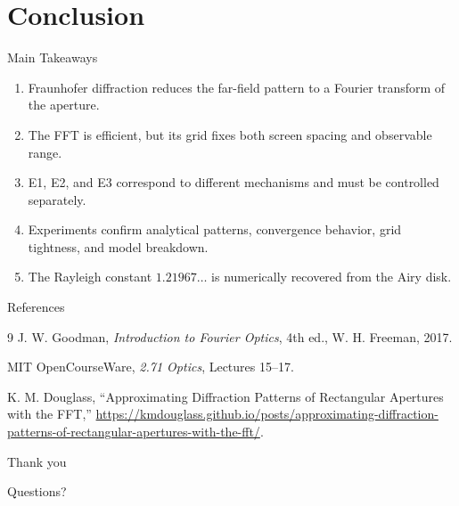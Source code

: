 \documentclass[aspectratio=169,11pt]{beamer}
\begin{document}
\section{Conclusion}

\begin{frame}{Main Takeaways}
    \begin{enumerate}
        \item Fraunhofer diffraction reduces the far-field pattern to a Fourier transform of the aperture.
        \item The FFT is efficient, but its grid fixes both screen spacing and observable range.
        \item E1, E2, and E3 correspond to different mechanisms and must be controlled separately.
        \item Experiments confirm analytical patterns, convergence behavior, grid tightness, and model
              breakdown.
        \item The Rayleigh constant \(1.21967\ldots\) is numerically recovered from the Airy disk.
    \end{enumerate}
\end{frame}

\begin{frame}{References}
    \footnotesize
    \begin{thebibliography}{9}
        J. W. Goodman, \textit{Introduction to Fourier Optics}, 4th ed., W. H. Freeman, 2017.

        MIT OpenCourseWare, \textit{2.71 Optics}, Lectures 15--17.

        K. M. Douglass, ``Approximating Diffraction Patterns of Rectangular Apertures with the FFT,''
        \url{https://kmdouglass.github.io/posts/approximating-diffraction-patterns-of-rectangular-apertures-with-the-fft/}.
    \end{thebibliography}
\end{frame}

\begin{frame}
    \centering
    \Huge Thank you

    \vspace{0.5cm}
    \large Questions?
\end{frame}
\end{document}
